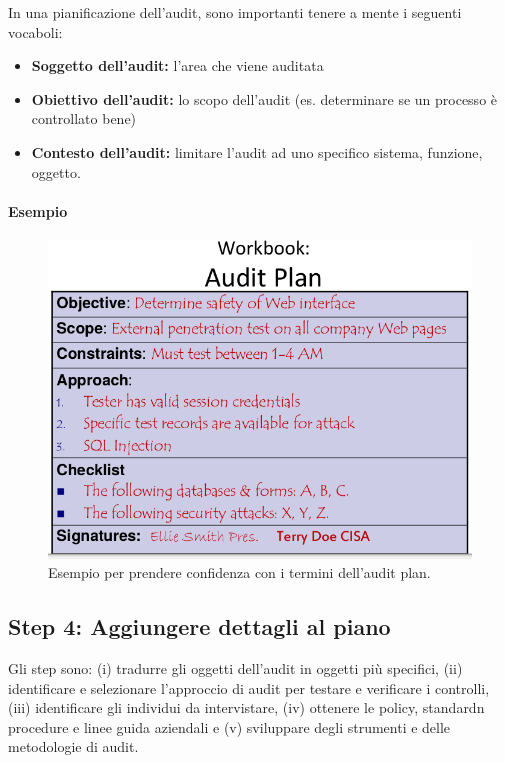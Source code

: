 In una pianificazione dell'audit, sono importanti tenere a mente i seguenti 
vocaboli:
\begin{itemize}
\item \textbf{Soggetto dell'audit:} l'area che viene auditata
\item \textbf{Obiettivo dell'audit:} lo scopo dell'audit (es. determinare se un processo 
è controllato bene)
\item \textbf{Contesto dell'audit:} limitare l'audit ad uno specifico sistema, funzione, 
oggetto.
\end{itemize}

\paragraph*{Esempio}

\begin{figure}[h!]
	\begin{center}
		
\includegraphics[scale=0.4]{res/img/audit_plan_vocabulary_example.png}
	\end{center}
	\caption{Esempio per prendere confidenza con i termini dell'audit plan.}
	\label{fig:audit:plan:vocabulary:example}
\end{figure}

\subsection{Step 4: Aggiungere dettagli al piano}

Gli step sono: (i) tradurre gli oggetti dell'audit in oggetti più specifici, 
(ii) identificare e selezionare l'approccio di audit per testare e verificare i 
controlli, (iii) identificare gli individui da intervistare, (iv) ottenere le 
policy, standardn procedure e linee guida aziendali e (v) sviluppare degli 
strumenti e delle metodologie di audit.

